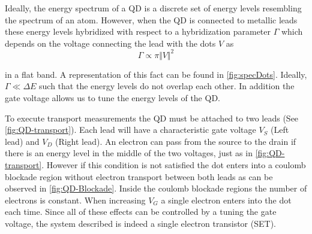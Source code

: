 

Ideally, the energy spectrum of a QD is a discrete set of energy levels resembling the spectrum of an atom. However, when the QD is connected to metallic leads these energy levels hybridized with respect to a hybridization parameter $\Gamma$ which depends on the voltage connecting the lead with the dots $V$ as 
\begin{equation}
    \Gamma \propto \pi \Vert V \Vert^2
\end{equation}

in a flat band. A representation of this fact can be found in  \ref{fig:specDots}. Ideally, $\Gamma \ll \Delta E$ such that the energy levels do not overlap each other. In addition the gate voltage allows us to tune the energy levels of the QD.

To execute transport measurements the QD must be attached to two leads (See \ref{fig:QD-transport}). Each lead will have a characteristic gate voltage $V_S$ (Left lead) and $V_D$ (Right lead). An electron can pass from the source to the drain if there is an energy level in the middle of the two voltages, just as in \ref{fig:QD-transport}. However if this condition is not satisfied the dot enters into a coulomb blockade region without  electron transport between both leads as can be observed in \ref{fig:QD-Blockade}. Inside the coulomb blockade regions the number of electrons is constant. When increasing $V_G$ a single electron enters into the dot each time. Since all of these effects can be controlled by a tuning the gate voltage, the system described is indeed a single electron transistor (SET).  









